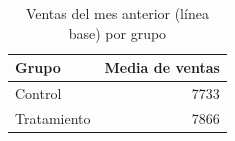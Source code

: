 
\begin{longtable}[t]{lr}
\caption{Ventas del mes anterior (línea base) por grupo}\\
\toprule
Grupo & Media de ventas\\
\midrule
Control & 7733\\
Tratamiento & 7866\\
\bottomrule
\end{longtable}
